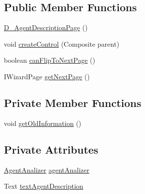 \subsection*{Public Member Functions}
\begin{DoxyCompactItemize}
\item 
\hyperlink{classit_1_1isislab_1_1masonassisteddocumentation_1_1mason_1_1wizards_1_1_d___agent_description_page_aee37d48e42e4d6f95404e42ecfd04e6d}{D\-\_\-\-Agent\-Description\-Page} ()
\item 
void \hyperlink{classit_1_1isislab_1_1masonassisteddocumentation_1_1mason_1_1wizards_1_1_d___agent_description_page_aff878d7cd601edf044658e6a06b389db}{create\-Control} (Composite parent)
\item 
boolean \hyperlink{classit_1_1isislab_1_1masonassisteddocumentation_1_1mason_1_1wizards_1_1_d___agent_description_page_a4cd29961ae4355329be27bdeb8185f15}{can\-Flip\-To\-Next\-Page} ()
\item 
I\-Wizard\-Page \hyperlink{classit_1_1isislab_1_1masonassisteddocumentation_1_1mason_1_1wizards_1_1_d___agent_description_page_acd32a9211894d81e238f54607d7b3f73}{get\-Next\-Page} ()
\end{DoxyCompactItemize}
\subsection*{Private Member Functions}
\begin{DoxyCompactItemize}
\item 
void \hyperlink{classit_1_1isislab_1_1masonassisteddocumentation_1_1mason_1_1wizards_1_1_d___agent_description_page_a0a7d91afd5148a932706e2b5c5a97b9f}{get\-Old\-Information} ()
\end{DoxyCompactItemize}
\subsection*{Private Attributes}
\begin{DoxyCompactItemize}
\item 
\hyperlink{classit_1_1isislab_1_1masonassisteddocumentation_1_1mason_1_1analizer_1_1_agent_analizer}{Agent\-Analizer} \hyperlink{classit_1_1isislab_1_1masonassisteddocumentation_1_1mason_1_1wizards_1_1_d___agent_description_page_a3551237b74a669c361623caa219af9d7}{agent\-Analizer}
\item 
Text \hyperlink{classit_1_1isislab_1_1masonassisteddocumentation_1_1mason_1_1wizards_1_1_d___agent_description_page_a36dfef5219d3c9d56facf7345020ee82}{text\-Agent\-Description}
\end{DoxyCompactItemize}
